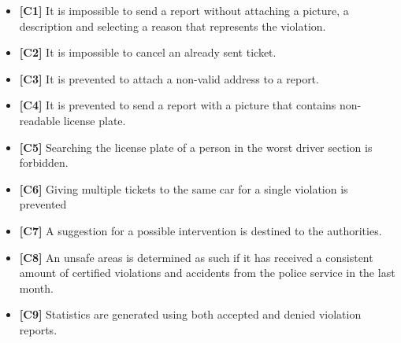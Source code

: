 \begin{itemize}
		\item \textbf{[\hypertarget{C1}{C1}]} It is impossible to send a report without attaching a picture, a description and selecting a reason that represents the violation. 
		\item \textbf{[\hypertarget{C2}{C2}]} It is impossible to cancel an already sent ticket. 
		\item \textbf{[\hypertarget{C3}{C3}]} It is prevented to attach a non-valid address to a report.
		\item \textbf{[\hypertarget{C4}{C4}]} It is prevented to send a report with a picture that contains non-readable license plate. 
		\item \textbf{[\hypertarget{C5}{C5}]} Searching the license plate of a person in the worst driver section is forbidden.
		\item \textbf{[\hypertarget{C6}{C6}]} Giving multiple tickets to the same car for a single violation is prevented
		\item \textbf{[\hypertarget{C7}{C7}]} A suggestion for a possible intervention is destined to the authorities.
		\item \textbf{[\hypertarget{C8}{C8}]} An unsafe areas is determined as such if it has received a consistent amount of certified violations and accidents from the police service in the last month. 
		\item \textbf{[\hypertarget{C9}{C9}]} Statistics are generated using both accepted and denied violation reports.
		
		
	\end{itemize}
\clearpage
